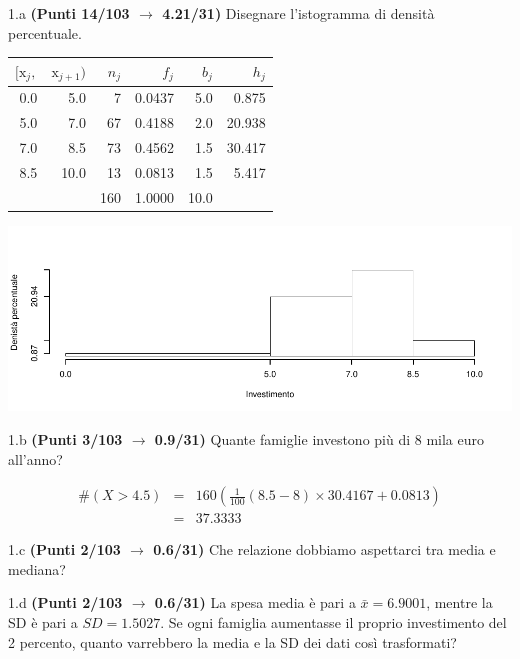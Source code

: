 \documentclass[
  11pt,
]{book}
\theoremstyle{mytheoremstyle}
\theoremstyle{mydefstyle}
\newenvironment{sol}
  {
  \begin{tcolorbox}[enhanced,breakable,arc=0.1mm,boxrule=1pt,colback=white,colframe=iblue,
  title=\bf \fontfamily{lmss}\selectfont \hspace{.5 cm} Soluzione,drop fuzzy shadow]

}{
\end{tcolorbox}
  }
\begin{document}
1.a \textbf{(Punti 14/103 \(\rightarrow\) 4.21/31)} Disegnare l'istogramma di densità percentuale.

\begin{sol}

\begin{table}[H]
\centering
\begin{tabular}{rrrrrr}
\toprule
$[\text{x}_j,$ & $\text{x}_{j+1})$ & $n_j$ & $f_j$ & $b_j$ & $h_j$\\
\midrule
0.0 & 5.0 & 7 & 0.0437 & 5.0 & 0.875\\
5.0 & 7.0 & 67 & 0.4188 & 2.0 & 20.938\\
7.0 & 8.5 & 73 & 0.4562 & 1.5 & 30.417\\
8.5 & 10.0 & 13 & 0.0813 & 1.5 & 5.417\\
 &  & 160 & 1.0000 & 10.0 & \\
\bottomrule
\end{tabular}
\end{table}

\begin{center}\includegraphics{Esami_passati_con_soluzioni_files/figure-latex/2023-117-1} \end{center}

\end{sol}

1.b \textbf{(Punti 3/103 \(\rightarrow\) 0.9/31)} Quante famiglie investono più di 8 mila euro all'anno?

\begin{sol}
\begin{eqnarray*}
  \#(X>4.5) &=&  160(\frac1{100}(8.5-8)\times30.4167+0.0813)\\
  &=& 37.3333
\end{eqnarray*}

\end{sol}

1.c \textbf{(Punti 2/103 \(\rightarrow\) 0.6/31)} Che relazione dobbiamo aspettarci tra media e mediana?

1.d \textbf{(Punti 2/103 \(\rightarrow\) 0.6/31)} La spesa media è pari a \(\bar x=6.9001\), mentre la SD è pari a \(SD=1.5027\).
Se ogni famiglia aumentasse il proprio investimento del 2 percento, quanto varrebbero la media e la SD dei dati così trasformati?
\end{document}
